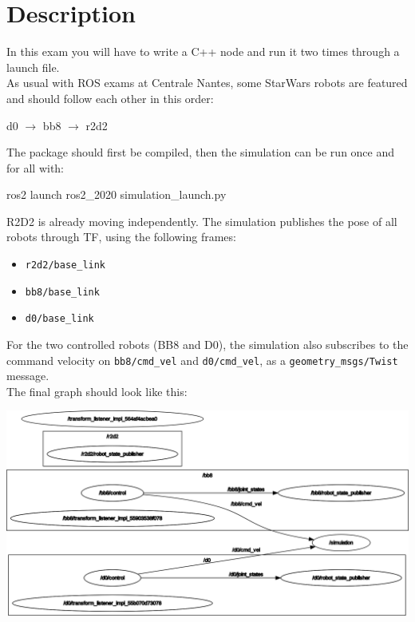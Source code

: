 \documentclass{ecnreport}
\begin{document}



\section{Description}

In this exam you will have to write a C++ node and run it two times through a launch file.\\
As usual with ROS exams at Centrale Nantes, some StarWars robots are featured and should follow each other in this order:
\begin{center}
 d0 $\rightarrow$ bb8 $\rightarrow$ r2d2
\end{center}

The package should first be compiled, then the simulation can be run once and for all with:
\begin{bashcodelarge}
 ros2 launch ros2_2020 simulation_launch.py
\end{bashcodelarge}


R2D2 is already moving independently. The simulation publishes the pose of all robots through TF, using the following frames:
\begin{itemize}
 \item \texttt{r2d2/base\_link}
 \item \texttt{bb8/base\_link}
 \item \texttt{d0/base\_link}
\end{itemize}

For the two controlled robots (BB8 and D0), the simulation also subscribes to the command velocity on \texttt{bb8/cmd\_vel} and \texttt{d0/cmd\_vel}, as a \texttt{geometry\_msgs/Twist} message.\\
The final graph should look like this:
\begin{center}
 \includegraphics[width=.8\linewidth]{rosgraph}
\end{center}
\end{document}
